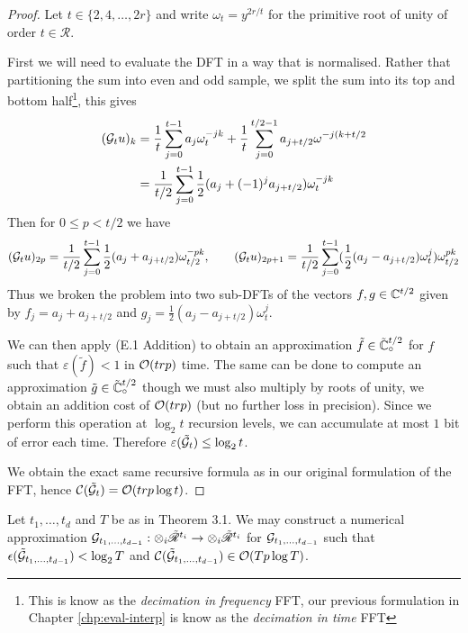 \begin{proof}

    Let $t \in \{2, 4, \ldots, 2r\}$ and write $\omega_t = y^{2r/t}$ for the primitive root of unity of order $t \in \mathscr{R}$. 

    First we will need to evaluate the DFT in a way that is normalised. Rather that partitioning the sum into even and odd sample, we split the sum into its top and bottom half\footnote{This is know as the \textit{decimation in frequency} FFT, our previous formulation in Chapter \ref{chp:eval-interp} is know as the \textit{decimation in time} FFT}, this gives
    \begin{align*}
        (\M{G}_t u)_k 
        &= \frac{1}{t}\sum^{t - 1}_{j=0} a_j \omega_t^{-jk} + \frac{1}{t} \sum^{t/2 - 1}_{j=0} a_{j + t/2} \omega^{-j(k + t/2}\\
        &= \frac{1}{t/2}\sum^{t - 1}_{j=0} \frac{1}{2}(a_j + (-1)^ja_{j + t/2})\omega_t^{\minus jk} \\
    \end{align*}
    Then for $0 \le p < t/2$ we have
    \[
        (\M{G}_t u)_{2p} = \frac{1}{t/2}\sum^{t - 1}_{j=0} \frac{1}{2}(a_j + a_{j + t/2})\omega_{t/2}^{\minus pk}, \qquad (\M{G}_t u)_{2p + 1} = \frac{1}{t/2}\sum^{t - 1}_{j=0} (\frac{1}{2}(a_j - a_{j + t/2})\omega_t^j)\omega_{t/2}^{pk}
    \]
    Thus we broken the problem into two sub-DFTs of the vectors $f, g \in {\mathbb C}^{t/2}$ given by $f_j = a_j + a_{j + t/2}$ and $g_j = \frac{1}{2}(a_j - a_{j + t/2})\omega_t^j$.

    We can then apply (E.1 Addition) to obtain an approximation $\tilde{f} \in \tilde{{\mathbb C}}^{t/2}_\circ$ for $f$ such that $\varepsilon(\tilde{f}) < 1$ in $\mathcal O(trp)$ time. The same can be done to compute an approximation $\tilde{g} \in \tilde{{\mathbb C}}^{t/2}_\circ$ though we must also multiply by roots of unity, we obtain an addition cost of $\mathcal O(trp)$ (but no further loss in precision). Since we perform this operation at $\log_2 t$ recursion levels, we can accumulate at most $1$ bit of error each time. Therefore $\varepsilon(\tilde{\mathcal G}_t) \le \log_2 t$.

    We obtain the exact same recursive formula as in our original formulation of the FFT, hence $\mathcal C(\tilde{\mathcal G}_t) = \mathcal O(trp \log t)$.
\end{proof}

\begin{proposition}\label{prop:multi-synth}
    Let $t_1, \ldots, t_d$ and $T$ be as in Theorem 3.1. We may construct a numerical approximation $\mathcal G_{t_1, \ldots, t_{d-1}}: \otimes_i \tilde{\mathscr{R}}^{t_i} \to \otimes_i \tilde{\mathscr{R}}^{t_i}$ for $\mathcal G_{t_1, \ldots, t_{d-1}}$ such that $\epsilon(\tilde{\mathcal G}_{t_1, \ldots, t_{d-1}}) < \log_2 T$ and $\mathcal C(\tilde{\mathcal G}_{t_1, \ldots, t_{d-1}}) \in \mathcal O(Tp \log T)$.
\end{proposition}

